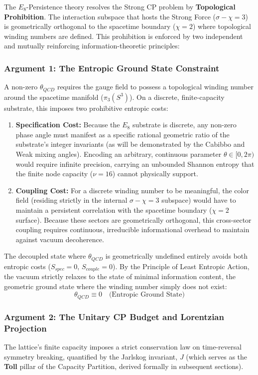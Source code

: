 The $E_8$-Persistence theory resolves the Strong CP problem by \textbf{Topological Prohibition}. The interaction subspace that hosts the Strong Force ($\sigma-\chi=3$) is geometrically orthogonal to the spacetime boundary ($\chi=2$) where topological winding numbers are defined. This prohibition is enforced by two independent and mutually reinforcing information-theoretic principles:

\subsubsection{Argument 1: The Entropic Ground State Constraint}
A non-zero $\theta_{QCD}$ requires the gauge field to possess a topological winding number around the spacetime manifold ($\pi_3(S^3)$). On a discrete, finite-capacity substrate, this imposes two prohibitive entropic costs:
\begin{enumerate}
    \item \textbf{Specification Cost:} Because the $E_8$ substrate is discrete, any non-zero phase angle must manifest as a specific rational geometric ratio of the substrate's integer invariants (as will be demonstrated by the Cabibbo and Weak mixing angles). Encoding an arbitrary, continuous parameter $\theta \in[0, 2\pi)$ would require infinite precision, carrying an unbounded Shannon entropy that the finite node capacity ($\nu=16$) cannot physically support.
    \item \textbf{Coupling Cost:} For a discrete winding number to be meaningful, the color field (residing strictly in the internal $\sigma-\chi=3$ subspace) would have to maintain a persistent correlation with the spacetime boundary ($\chi=2$ surface). Because these sectors are geometrically orthogonal, this cross-sector coupling requires continuous, irreducible informational overhead to maintain against vacuum decoherence.
\end{enumerate}
The decoupled state where $\theta_{QCD}$ is geometrically undefined entirely avoids both entropic costs ($S_{spec}=0$, $S_{couple}=0$). By the Principle of Least Entropic Action, the vacuum strictly relaxes to the state of minimal information content, the geometric ground state where the winding number simply does not exist:
\begin{equation}
    \theta_{QCD} \equiv 0 \quad \text{(Entropic Ground State)}
\end{equation}

\subsubsection{Argument 2: The Unitary CP Budget and Lorentzian Projection}
The lattice's finite capacity imposes a strict conservation law on time-reversal symmetry breaking, quantified by the Jarlskog invariant, $J$ (which serves as the \textbf{Toll} pillar of the Capacity Partition, derived formally in subsequent sections). 

